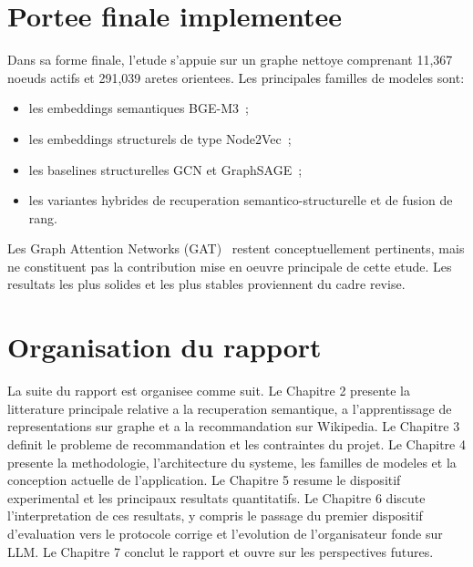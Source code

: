 \section{Portee finale implementee}

Dans sa forme finale, l'etude s'appuie sur un graphe nettoye comprenant 11,367
noeuds actifs et 291,039 aretes orientees. Les principales familles de modeles
sont:
\begin{itemize}
    \item les embeddings semantiques BGE-M3~\cite{chen2025bgem3};
    \item les embeddings structurels de type Node2Vec~\cite{grover2016node2vec};
    \item les baselines structurelles GCN et GraphSAGE~\cite{kipf2017semi,hamilton2017inductive};
    \item les variantes hybrides de recuperation semantico-structurelle et de
    fusion de rang.
\end{itemize}

Les Graph Attention Networks (GAT)~\cite{velickovic2018graph} restent
conceptuellement pertinents, mais ne constituent pas la contribution mise en
oeuvre principale de cette etude. Les resultats les plus solides et les plus
stables proviennent du cadre revise.

\section{Organisation du rapport}

La suite du rapport est organisee comme suit. Le Chapitre 2 presente la
litterature principale relative a la recuperation semantique, a
l'apprentissage de representations sur graphe et a la recommandation sur
Wikipedia. Le Chapitre 3 definit le probleme de recommandation et les
contraintes du projet. Le Chapitre 4 presente la methodologie, l'architecture
du systeme, les familles de modeles et la conception actuelle de l'application.
Le Chapitre 5 resume le dispositif experimental et les principaux resultats
quantitatifs. Le Chapitre 6 discute l'interpretation de ces resultats, y
compris le passage du premier dispositif d'evaluation vers le protocole corrige
et l'evolution de l'organisateur fonde sur LLM. Le Chapitre 7 conclut le
rapport et ouvre sur les perspectives futures.
